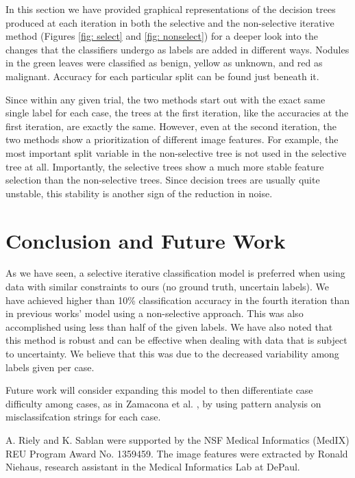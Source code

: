 \documentclass[]{spie}
\begin{document}

In this section we have provided graphical representations of the decision trees produced at each iteration in both the selective and the non-selective iterative method (Figures \ref{fig: select} and \ref{fig: nonselect}) for a deeper look into the changes that the classifiers undergo as labels are added in different ways. Nodules in the green leaves were classified as benign, yellow as unknown, and red as malignant. Accuracy for each particular split can be found just beneath it.

Since within any given trial, the two methods start out with the exact same single label for each case, the trees at the first iteration, like the accuracies at the first iteration, are exactly the same. However, even at the second iteration, the two methods show a prioritization of different image features. For example, the most important split variable in the non-selective tree is not used in the selective tree at all. Importantly, the selective trees show a much more stable feature selection than the non-selective trees. Since decision trees are usually quite unstable, this stability is another sign of the reduction in noise.

\section{Conclusion and Future Work}
\label{sec:conclusion}
As we have seen, a selective iterative classification model is preferred when using data with similar constraints to ours (no ground truth, uncertain labels). We have achieved higher than 10\% classification accuracy in the fourth iteration than in previous works’ model using a non-selective approach. This was also accomplished using less than half of the given labels. We have also noted that this method is robust and can be effective when dealing with data that is subject to uncertainty. We believe that this was due to the decreased variability among labels given per case. 
	
Future work will consider expanding this model to then differentiate case difficulty among cases, as in Zamacona et al. \cite{Zamacona13}, by using pattern analysis on misclassifcation strings for each case. 
\acknowledgments      
 
A. Riely and K. Sablan were supported by the NSF Medical Informatics (MedIX) REU Program Award No. 1359459.  The image features were extracted by Ronald Niehaus, research assistant in the Medical Informatics Lab at DePaul.


\end{document}
